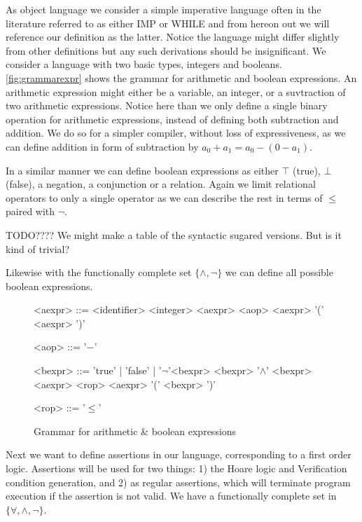 As object language we consider a simple imperative language often in the literature referred to as either
IMP or WHILE and from hereon out we will reference our definition as the latter. Notice the language might differ slightly from other definitions but any such derivations should be insignificant.
We consider a language with two basic types, integers and booleans.
\autoref{fig:grammarexpr} shows the grammar for arithmetic and boolean expressions.
An arithmetic expression might either be a variable, an integer, or a suvtraction of two arithmetic expressions.
Notice here than we only define a single binary operation for arithmetic expressions, instead of defining both subtraction and addition.
We do so for a simpler compiler, without loss of expressiveness, as we can define addition in form of subtraction by
$a_{0} + a_{1} = a_{0} - (0 - a_{1})$.

In a similar manner we can define boolean expressions as either $\top$ (true), $\bot$ (false), a negation, a conjunction or a relation. Again we limit relational operators to only a single operator as we can describe the rest in terms of $\leq$ paired with $\neg$.

\colorbox{BurntOrange}{TODO???? We might make a table of the syntactic sugared versions. But is it kind of trivial?}

Likewise with the functionally complete set $\{\wedge, \neg\}$ we can define all possible boolean expressions.

\begin{figure}[h!]
\centering
\begin{grammar}
<aexpr> ::= <identifier>
\alt <integer>
\alt <aexpr> <aop> <aexpr>
\alt '(' <aexpr> ')'

<aop> ::= '$-$'

<bexpr> ::= 'true' | 'false' | \alt '$\neg$'<bexpr>
\alt <bexpr> '$\wedge$' <bexpr>
\alt <aexpr> <rop> <aexpr>
\alt '(' <bexpr> ')'

<rop> ::= '$\le$'
\end{grammar}
\label{fig:grammarexpr}
\caption{Grammar for arithmetic \& boolean expressions}
\end{figure}

Next we want to define assertions in our language, corresponding to a first order logic.
Assertions will be used for two things: 1) the Hoare logic and Verification condition generation, and 2) as regular assertions, which will terminate program execution if the assertion is not valid.
We have a functionally complete set in $\{\forall, \wedge, \neg\}$.

